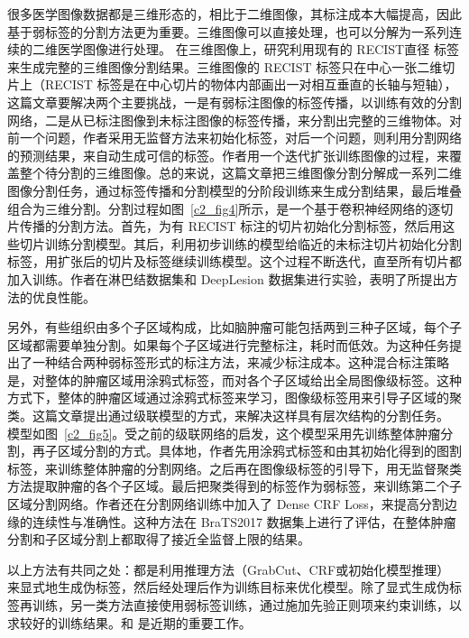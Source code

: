 很多医学图像数据都是三维形态的，相比于二维图像，其标注成本大幅提高，因此基于弱标签的分割方法更为重要。三维图像可以直接处理，也可以分解为一系列连续的二维医学图像进行处理。
在三维图像上，\citet{cai2018accurate}研究利用现有的 RECIST直径 标签来生成完整的三维图像分割结果。三维图像的 RECIST 标签只在中心一张二维切片上（RECIST 标签是在中心切片的物体内部画出一对相互垂直的长轴与短轴），这篇文章要解决两个主要挑战，一是有弱标注图像的标签传播，以训练有效的分割网络，二是从已标注图像到未标注图像的标签传播，来分割出完整的三维物体。对前一个问题，作者采用无监督方法来初始化标签，对后一个问题，则利用分割网络的预测结果，来自动生成可信的标签。作者用一个迭代扩张训练图像的过程，来覆盖整个待分割的三维图像。总的来说，这篇文章把三维图像分割分解成一系列二维图像分割任务，通过标签传播和分割模型的分阶段训练来生成分割结果，最后堆叠组合为三维分割。分割过程如图~\ref{c2_fig4}所示，是一个基于卷积神经网络的逐切片传播的分割方法。首先，为有 RECIST 标注的切片初始化分割标签，然后用这些切片训练分割模型。其后，利用初步训练的模型给临近的未标注切片初始化分割标签，用扩张后的切片及标签继续训练模型。这个过程不断迭代，直至所有切片都加入训练。作者在淋巴结数据集\citep{roth2014new}和 DeepLesion 数据集\citep{yan2018deep}进行实验，表明了所提出方法的优良性能。

另外，有些组织由多个子区域构成，比如脑肿瘤可能包括两到三种子区域，每个子区域都需要单独分割。如果每个子区域进行完整标注，耗时而低效。\citet{ji2019scribble}为这种任务提出了一种结合两种弱标签形式的标注方法，来减少标注成本。这种混合标注策略是，对整体的肿瘤区域用涂鸦式标签，而对各个子区域给出全局图像级标签。这种方式下，整体的肿瘤区域通过涂鸦式标签来学习，图像级标签用来引导子区域的聚类。这篇文章提出通过级联模型的方式，来解决这样具有层次结构的分割任务。
模型如图~\ref{c2_fig5}。受之前的级联网络的启发，这个模型采用先训练整体肿瘤分割，再子区域分割的方式。具体地，作者先用涂鸦式标签和由其初始化得到的图割标签，来训练整体肿瘤的分割网络。之后再在图像级标签的引导下，用无监督聚类方法提取肿瘤的各个子区域。最后把聚类得到的标签作为弱标签，来训练第二个子区域分割网络。作者还在分割网络训练中加入了 Dense CRF Loss，来提高分割边缘的连续性与准确性。这种方法在 BraTS2017 数据集\citep{menze2014multimodal}上进行了评估，在整体肿瘤分割和子区域分割上都取得了接近全监督上限的结果。

以上方法有共同之处：都是利用推理方法（GrabCut、CRF或初始化模型推理）来显式地生成伪标签，然后经处理后作为训练目标来优化模型。除了显式生成伪标签再训练，另一类方法直接使用弱标签训练，通过施加先验正则项来约束训练，以求较好的训练结果。\citet{tang2018regularized}和 \citet{kervadec2020bounding}是近期的重要工作。

